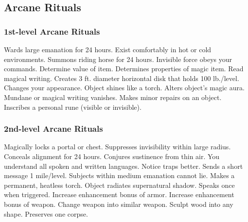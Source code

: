 \subsection{Arcane Rituals}\label{Arcane Rituals}
\subsubsection{1st-level Arcane Rituals}
\begin{rituallist}
     Wards large emanation for 24 hours.
     Exist comfortably in hot or cold environments.
     Summons riding horse for 24 hours.
     Invisible force obeys your commands.
     Determine value of item.
     Determines properties of magic item.
     Read magical writing.
     Creates 3 ft. diameter horizontal disk that holds 100 lb./level.
     Changes your appearance.
     Object shines like a torch.
     Alters object's magic aura.
     Mundane or magical writing vanishes.
     Makes minor repairs on an object.
     Inscribes a personal rune (visible or invisible).
\end{rituallist}

\subsubsection{2nd-level Arcane Rituals}
\begin{rituallist}
     Magically locks a portal or chest.
     Suppresses invisibility within large radius.
     Conceals alignment for 24 hours.
     Conjures sustinence from thin air.
     You understand all spoken and written languages.
     Notice traps better.
     Sends a short message 1 mile/level.
     Subjects within medium emanation cannot lie.
     Makes a permanent, heatless torch.
     Object radiates supernatural shadow.
     Speaks once when triggered.
     Increase enhancement bonus of armor.
     Increase enhancement bonus of weapon.
     Change weapon into similar weapon.
     Sculpt wood into any shape.
     Preserves one corpse.
\end{rituallist}

